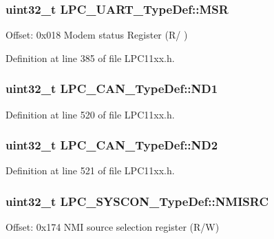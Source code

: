 \subsubsection[{\texorpdfstring{M\+SR}{MSR}}]{ uint32\+\_\+t L\+P\+C\+\_\+\+U\+A\+R\+T\+\_\+\+Type\+Def\+::\+M\+SR}\hypertarget{group___l_p_c11xx___definitions_ga00bcf65497b984bf5b06ce6727d76161}{}\label{group___l_p_c11xx___definitions_ga00bcf65497b984bf5b06ce6727d76161}
Offset\+: 0x018 Modem status Register (R/ ) 

Definition at line 385 of file L\+P\+C11xx.\+h.

\subsubsection[{\texorpdfstring{N\+D1}{ND1}}]{ uint32\+\_\+t L\+P\+C\+\_\+\+C\+A\+N\+\_\+\+Type\+Def\+::\+N\+D1}\hypertarget{group___l_p_c11xx___definitions_gabf5351cb5630c84bdbf56ac6229d7eb0}{}\label{group___l_p_c11xx___definitions_gabf5351cb5630c84bdbf56ac6229d7eb0}


Definition at line 520 of file L\+P\+C11xx.\+h.

\subsubsection[{\texorpdfstring{N\+D2}{ND2}}]{ uint32\+\_\+t L\+P\+C\+\_\+\+C\+A\+N\+\_\+\+Type\+Def\+::\+N\+D2}\hypertarget{group___l_p_c11xx___definitions_gad40c20ab0f7db488eb3b52f6e45b726b}{}\label{group___l_p_c11xx___definitions_gad40c20ab0f7db488eb3b52f6e45b726b}


Definition at line 521 of file L\+P\+C11xx.\+h.

\subsubsection[{\texorpdfstring{N\+M\+I\+S\+RC}{NMISRC}}]{ uint32\+\_\+t L\+P\+C\+\_\+\+S\+Y\+S\+C\+O\+N\+\_\+\+Type\+Def\+::\+N\+M\+I\+S\+RC}\hypertarget{group___l_p_c11xx___definitions_ga5d5f01b7f5f9ebc4067a0599113db0cd}{}\label{group___l_p_c11xx___definitions_ga5d5f01b7f5f9ebc4067a0599113db0cd}
Offset\+: 0x174 N\+MI source selection register (R/W) 

